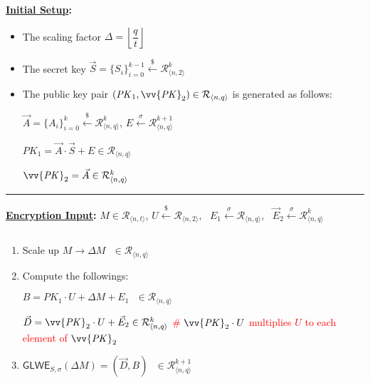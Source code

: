 \begin{tcolorbox}[title={\textbf{\tboxlabel{\ref*{subsec:glwe-enc}} GLWE Public Key Encryption}}]

\textbf{\underline{Initial Setup}:} 
\begin{itemize}
\item The scaling factor $\Delta = \left\lfloor\dfrac{q}{t}\right\rfloor$
\item The secret key $\vec{S} = \{S_i\}_{i=0}^{k-1} \xleftarrow{\$} \mathcal{R}_{\langle n, 2 \rangle}^k$
\item The public key pair $(\mathit{PK}_1, \vv{\mathit{PK}}_2) \in \mathcal{R}_{\langle n, q \rangle}$ is generated as follows:

$\vec{A} = \{A_i\}_{i=0}^{k} \xleftarrow{\$} \mathcal{R}_{\langle n, q \rangle}^k$, \text{ } $E \xleftarrow{\sigma} \mathcal{R}_{\langle n, q \rangle}^{k+1}$

$\mathit{PK}_1 = \vec{A} \cdot \vec{S} + E \in \mathcal{R}_{\langle n, q \rangle}$

$\vv{\mathit{PK}}_2 = \vec{A} \in \mathcal{R}_{\langle n, q \rangle}^{k}$

\end{itemize}

\par\noindent\rule{\textwidth}{0.4pt}

\textbf{\underline{Encryption Input}:} $M \in \mathcal{R}_{\langle n, t \rangle}$, \text{ } $U \xleftarrow{\$} \mathcal{R}_{\langle n,2 \rangle}, \text{ } E_1 \xleftarrow{\sigma} \mathcal{R}_{\langle n,q \rangle}, \text{ } \vec{E}_2 \xleftarrow{\sigma} \mathcal{R}_{\langle n,q \rangle}^k$

$ $

\begin{enumerate}

\item Scale up $M \longrightarrow \Delta M \text { } \in \mathcal{R}_{\langle n, q\rangle}$

\item Compute the followings: 

$B = \mathit{PK}_1\cdot U + \Delta  M + E_1 \text{ } \in \mathcal{R}_{\langle n,q \rangle}$

$\vec{D} = \vv{{\mathit{PK}}}_2 \cdot U + \vec{E}_2 \in \mathcal{R}_{\langle n,q \rangle}^{k}$ \textcolor{red}{\text{ } \# $\vv{\mathit{PK}}_2 \cdot U$ multiplies $U$ to each element of $\vv{\mathit{PK}}_2$}

\item $\textsf{GLWE}_{S,\sigma}(\Delta M) = (\vec{D}, B) \text{ } \in \mathcal{R}_{\langle n,q \rangle}^{k+1}$ 




\end{enumerate}
\end{tcolorbox}

